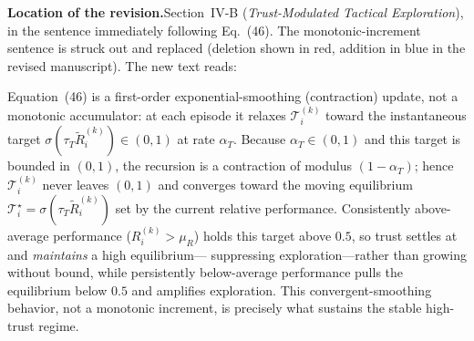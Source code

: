 \documentclass[11pt]{article}
\newcommand{\loc}{\medskip\noindent\textbf{Location of the revision.}\quad}
\newcommand{\evi}{\medskip\noindent\textbf{Supporting evidence (this letter).}\quad}
\begin{document}
\loc Section~IV-B (\emph{Trust-Modulated Tactical Exploration}), in the sentence
immediately following Eq.~(46). The monotonic-increment sentence is struck out and
replaced (deletion shown in red, addition in blue in the revised manuscript). The
new text reads:

\begin{manuscripttext}
Equation~(46) is a first-order exponential-smoothing (contraction) update, not a
monotonic accumulator: at each episode it relaxes $\mathcal{T}_i^{(k)}$ toward the
instantaneous target $\sigma(\tau_T\tilde{R}_i^{(k)})\in(0,1)$ at rate $\alpha_T$.
Because $\alpha_T\in(0,1)$ and this target is bounded in $(0,1)$, the recursion is a
contraction of modulus $(1-\alpha_T)$; hence $\mathcal{T}_i^{(k)}$ never leaves
$(0,1)$ and converges toward the moving equilibrium
$\mathcal{T}_i^{\star}=\sigma(\tau_T\tilde{R}_i^{(k)})$ set by the current relative
performance. Consistently above-average performance ($R_i^{(k)}>\mu_R$) holds this
target above $0.5$, so trust settles at and \emph{maintains} a high equilibrium---
suppressing exploration---rather than growing without bound, while persistently
below-average performance pulls the equilibrium below $0.5$ and amplifies
exploration. This convergent-smoothing behavior, not a monotonic increment, is
precisely what sustains the stable high-trust regime.
\end{manuscripttext}


\end{document}
